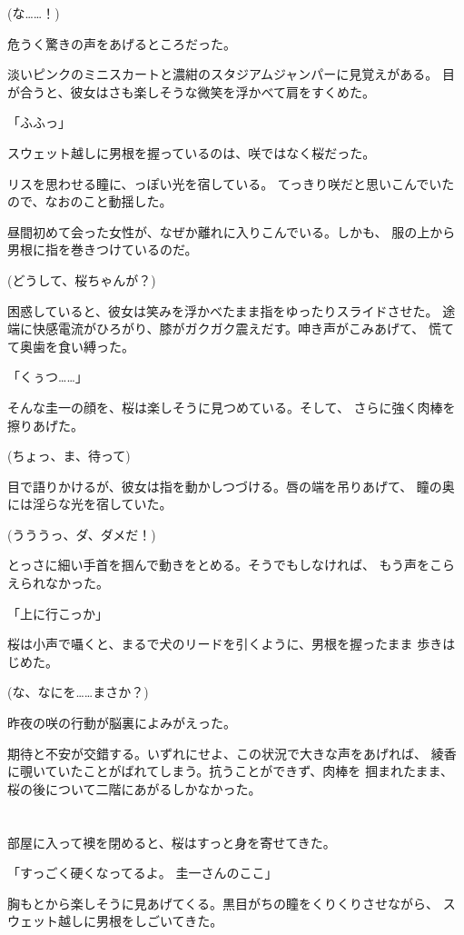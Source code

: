 ﻿\documentclass[
    book,tate,
    line_length=30zw,
    jafontsize=12pt,
    paper=b5j,
    landscape,
    ]{jlreq}
\begin{document}
(な……！)

危うく驚きの声をあげるところだった。

淡いピンクのミニスカートと濃紺のスタジアムジャンパーに見覚えがある。
目が合うと、彼女はさも楽しそうな微笑を浮かべて肩をすくめた。

「ふふっ」

スウェット越しに男根を握っているのは、咲ではなく桜だった。

リスを思わせる瞳に、っぽい光を宿している。
てっきり咲だと思いこんでいたので、なおのこと動揺した。

昼間初めて会った女性が、なぜか離れに入りこんでいる。しかも、
服の上から男根に指を巻きつけているのだ。

(どうして、桜ちゃんが？)

困惑していると、彼女は笑みを浮かべたまま指をゆったりスライドさせた。
途端に快感電流がひろがり、膝がガクガク震えだす。呻き声がこみあげて、
慌てて奥歯を食い縛った。

「くぅつ……」

そんな圭一の顔を、桜は楽しそうに見つめている。そして、
さらに強く肉棒を擦りあげた。

(ちょっ、ま、待って)

目で語りかけるが、彼女は指を動かしつづける。唇の端を吊りあげて、
瞳の奥には淫らな光を宿していた。

(うううっ、ダ、ダメだ！)

とっさに細い手首を掴んで動きをとめる。そうでもしなければ、
もう声をこらえられなかった。

「上に行こっか」

桜は小声で囁くと、まるで犬のリードを引くように、男根を握ったまま
歩きはじめた。

(な、なにを……まさか？)

昨夜の咲の行動が脳裏によみがえった。

期待と不安が交錯する。いずれにせよ、この状況で大きな声をあげれば、
綾香に覗いていたことがばれてしまう。抗うことができず、肉棒を
掴まれたまま、桜の後について二階にあがるしかなかった。

\section*{}

部屋に入って襖を閉めると、桜はすっと身を寄せてきた。

「すっごく硬くなってるよ。 圭一さんのここ」

胸もとから楽しそうに見あげてくる。黒目がちの瞳をくりくりさせながら、
スウェット越しに男根をしごいてきた。
\end{document}
